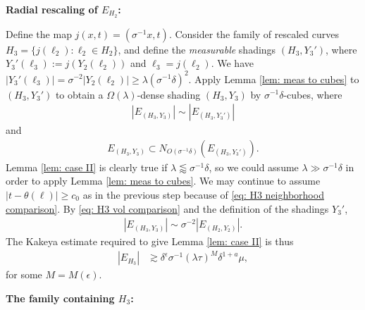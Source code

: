 \documentclass[12pt]{amsart}
\numberwithin{equation}{section}
\newcommand{\1}{\mathbbm{1}}
\begin{document}
\medskip


\noindent \textbf{Radial rescaling of $E_{H_2}$:}

Define the map $j(x,t) =(\sigma^{-1}x,t)$. Consider the family of rescaled curves $H_3 = \{j(\ell_2) : \ell_2 \in H_2\}$, and define the \emph{measurable} shadings $(H_3, Y_3')$, where $Y_3'(\ell_3):=j(Y_2(\ell_2))$ and $\ell_3 = j(\ell_2)$. We have $|Y_3'(\ell_3)| =\sigma^{-2} |Y_2(\ell_2)| \geq \lambda (\sigma^{-1} \delta)^2$. Apply Lemma \ref{lem: meas to cubes} to $(H_3, Y_3')$ to obtain a $\Omega(\lambda)$-dense shading $(H_3, Y_3)$ by $\sigma^{-1} \delta$-cubes, where 
\begin{align}\label{eq: H3 vol comparison}
    |E_{(H_3, Y_3)}| \sim |E_{(H_3, Y_3')}|
\end{align}
and 
\begin{align}\label{eq: H3 neighborhood comparison}
    E_{(H_3, Y_3)} \subset N_{O(\sigma^{-1} \delta)}(E_{(H_3,Y_3')}).
\end{align}
Lemma \ref{lem: case II} is clearly true if $\lambda \lessapprox \sigma^{-1} \delta$, so we could assume $\lambda \gg \sigma^{-1} \delta$ in order to apply Lemma \ref{lem: meas to cubes}. We may continue to assume $|t - \theta(\ell)| \geq c_0$ as in the previous step because of \eqref{eq: H3 neighborhood comparison}. By \eqref{eq: H3 vol comparison} and the definition of the shadings $Y_3'$, 
\begin{align}
    |E_{(H_3, Y_3)}| \sim \sigma^{-2} |E_{(H_2,Y_2)}|.
\end{align}
The Kakeya estimate required to give Lemma \ref{lem: case II} is thus
\begin{align}
    |E_{H_3}| & 
    \gtrsim \delta^{\epsilon} \sigma^{-1} (\lambda \tau)^{M} \delta^{1 + a} \mu,
\end{align}
for some $M = M(\epsilon)$. 

\medskip

\noindent \textbf{The family containing $H_3$:}
\end{document}
